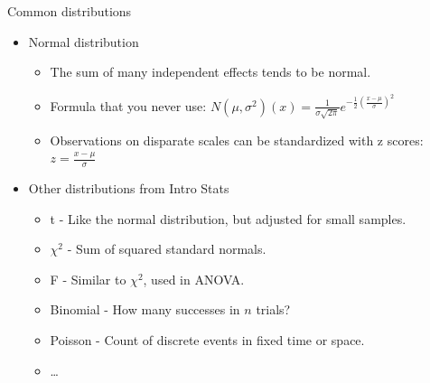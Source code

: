 \documentclass[
  ignorenonframetext,
]{beamer}
\providecommand{\tightlist}{%
  \setlength{\itemsep}{0pt}\setlength{\parskip}{0pt}}
\begin{document}
\begin{frame}{Common distributions}
\protect\hypertarget{common-distributions}{}

\begin{itemize}
\tightlist
\item
  Normal distribution

  \begin{itemize}
  \tightlist
  \item
    The sum of many independent effects tends to be normal.
  \item
    Formula that you never use:
    \(\displaystyle N(\mu,\sigma^2)(x)=\frac{1}{\sigma\sqrt{2 \pi}}e^{-\frac{1}{2}\left(\frac{x-\mu}{\sigma}\right)^2}\)
  \item
    Observations on disparate scales can be standardized with z scores:
    \(\displaystyle z=\frac{x-\mu}{\sigma}\)
  \end{itemize}
\end{itemize}

\medskip

\begin{itemize}
\tightlist
\item
  Other distributions from Intro Stats

  \begin{itemize}
  \tightlist
  \item
    t - Like the normal distribution, but adjusted for small samples.
  \item
    \(\chi^2\) - Sum of squared standard normals.
  \item
    F - Similar to \(\chi^2\), used in ANOVA.
  \item
    Binomial - How many successes in \(n\) trials?
  \item
    Poisson - Count of discrete events in fixed time or space.
  \item
    \ldots
  \end{itemize}
\end{itemize}

\end{frame}
\end{document}
